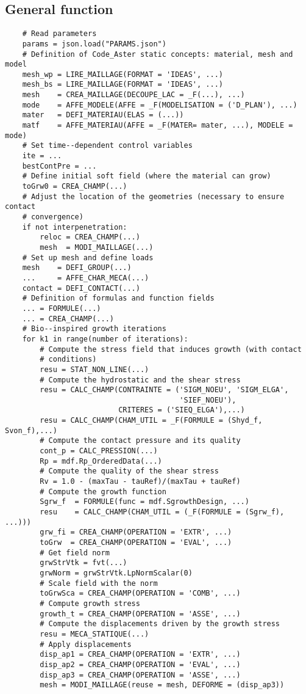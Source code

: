 \documentclass{article}
\begin{document}
\subsection{General function}
\begin{verbatim}
    # Read parameters
    params = json.load("PARAMS.json")
    # Definition of Code_Aster static concepts: material, mesh and model
    mesh_wp = LIRE_MAILLAGE(FORMAT = 'IDEAS', ...)
    mesh_bs = LIRE_MAILLAGE(FORMAT = 'IDEAS', ...)
    mesh    = CREA_MAILLAGE(DECOUPE_LAC = _F(...), ...)
    mode    = AFFE_MODELE(AFFE = _F(MODELISATION = ('D_PLAN'), ...)
    mater   = DEFI_MATERIAU(ELAS = (...))
    matf    = AFFE_MATERIAU(AFFE = _F(MATER= mater, ...), MODELE = mode)
    # Set time--dependent control variables
    ite = ...
    bestContPre = ...
    # Define initial soft field (where the material can grow)
    toGrw0 = CREA_CHAMP(...)
    # Adjust the location of the geometries (necessary to ensure contact
    # convergence)
    if not interpenetration:
        reloc = CREA_CHAMP(...)
        mesh  = MODI_MAILLAGE(...)
    # Set up mesh and define loads
    mesh    = DEFI_GROUP(...)
    ...     = AFFE_CHAR_MECA(...)
    contact = DEFI_CONTACT(...)
    # Definition of formulas and function fields
    ... = FORMULE(...)
    ... = CREA_CHAMP(...)
    # Bio--inspired growth iterations
    for k1 in range(number of iterations):
        # Compute the stress field that induces growth (with contact
        # conditions)
        resu = STAT_NON_LINE(...)
        # Compute the hydrostatic and the shear stress
        resu = CALC_CHAMP(CONTRAINTE = ('SIGM_NOEU', 'SIGM_ELGA',
                                        'SIEF_NOEU'),
                          CRITERES = ('SIEQ_ELGA'),...)
        resu = CALC_CHAMP(CHAM_UTIL = _F(FORMULE = (Shyd_f, Svon_f),...)
        # Compute the contact pressure and its quality
        cont_p = CALC_PRESSION(...)
        Rp = mdf.Rp_OrderedData(...)
        # Compute the quality of the shear stress
        Rv = 1.0 - (maxTau - tauRef)/(maxTau + tauRef)
        # Compute the growth function
        Sgrw_f  = FORMULE(func = mdf.SgrowthDesign, ...)
        resu    = CALC_CHAMP(CHAM_UTIL = (_F(FORMULE = (Sgrw_f), ...)))
        grw_fi = CREA_CHAMP(OPERATION = 'EXTR', ...)
        toGrw  = CREA_CHAMP(OPERATION = 'EVAL', ...)
        # Get field norm
        grwStrVtk = fvt(...)
        grwNorm = grwStrVtk.LpNormScalar(0)
        # Scale field with the norm
        toGrwSca = CREA_CHAMP(OPERATION = 'COMB', ...)
        # Compute growth stress
        growth_t = CREA_CHAMP(OPERATION = 'ASSE', ...)
        # Compute the displacements driven by the growth stress
        resu = MECA_STATIQUE(...)
        # Apply displacements
        disp_ap1 = CREA_CHAMP(OPERATION = 'EXTR', ...)
        disp_ap2 = CREA_CHAMP(OPERATION = 'EVAL', ...)
        disp_ap3 = CREA_CHAMP(OPERATION = 'ASSE', ...)
        mesh = MODI_MAILLAGE(reuse = mesh, DEFORME = (disp_ap3))
\end{verbatim}
\end{document}
